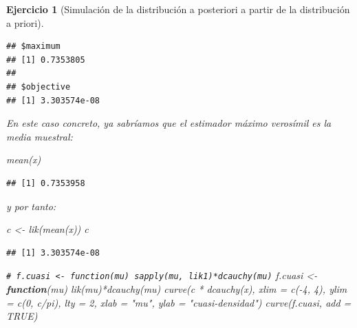 \documentclass[
]{book}
\newenvironment{Shaded}{\begin{snugshade}}{\end{snugshade}}
\newcommand{\AttributeTok}[1]{\textcolor[rgb]{0.77,0.63,0.00}{#1}}
\newcommand{\CommentTok}[1]{\textcolor[rgb]{0.56,0.35,0.01}{\textit{#1}}}
\newcommand{\ConstantTok}[1]{\textcolor[rgb]{0.00,0.00,0.00}{#1}}
\newcommand{\ControlFlowTok}[1]{\textcolor[rgb]{0.13,0.29,0.53}{\textbf{#1}}}
\newcommand{\DecValTok}[1]{\textcolor[rgb]{0.00,0.00,0.81}{#1}}
\newcommand{\FunctionTok}[1]{\textcolor[rgb]{0.00,0.00,0.00}{#1}}
\newcommand{\NormalTok}[1]{#1}
\newcommand{\OtherTok}[1]{\textcolor[rgb]{0.56,0.35,0.01}{#1}}
\newcommand{\SpecialCharTok}[1]{\textcolor[rgb]{0.00,0.00,0.00}{#1}}
\newcommand{\StringTok}[1]{\textcolor[rgb]{0.31,0.60,0.02}{#1}}
\theoremstyle{break}
\newtheorem{exercise}{Ejercicio}[chapter]
\theoremstyle{nonumberplain}
\renewcommand{\CommentTok}[1]{\textcolor[rgb]{0.41,0.41,0.41}{\texttt{#1}}}
\begin{document}
\begin{exercise}[Simulación de la distribución a posteriori a partir de la distribución a priori]
\begin{enumerate}
\begin{verbatim}
## $maximum
## [1] 0.7353805
## 
## $objective
## [1] 3.303574e-08
\end{verbatim}

\begin{Shaded}
\end{Shaded}

  En este caso concreto, ya sabríamos que el estimador máximo verosímil es la media muestral:

\begin{Shaded}
\begin{Highlighting}[]
\FunctionTok{mean}\NormalTok{(x)}
\end{Highlighting}
\end{Shaded}

\begin{verbatim}
## [1] 0.7353958
\end{verbatim}

  y por tanto:

\begin{Shaded}
\begin{Highlighting}[]
\NormalTok{c }\OtherTok{\textless{}{-}} \FunctionTok{lik}\NormalTok{(}\FunctionTok{mean}\NormalTok{(x))}
\NormalTok{c   }
\end{Highlighting}
\end{Shaded}

\begin{verbatim}
## [1] 3.303574e-08
\end{verbatim}

\begin{Shaded}
\begin{Highlighting}[]
\CommentTok{\# f.cuasi \textless{}{-} function(mu) sapply(mu, lik1)*dcauchy(mu)}
\NormalTok{f.cuasi }\OtherTok{\textless{}{-}} \ControlFlowTok{function}\NormalTok{(mu) }\FunctionTok{lik}\NormalTok{(mu)}\SpecialCharTok{*}\FunctionTok{dcauchy}\NormalTok{(mu)    }
\FunctionTok{curve}\NormalTok{(c }\SpecialCharTok{*} \FunctionTok{dcauchy}\NormalTok{(x), }\AttributeTok{xlim =} \FunctionTok{c}\NormalTok{(}\SpecialCharTok{{-}}\DecValTok{4}\NormalTok{, }\DecValTok{4}\NormalTok{), }\AttributeTok{ylim =} \FunctionTok{c}\NormalTok{(}\DecValTok{0}\NormalTok{, c}\SpecialCharTok{/}\NormalTok{pi), }\AttributeTok{lty =} \DecValTok{2}\NormalTok{,}
      \AttributeTok{xlab =} \StringTok{"mu"}\NormalTok{, }\AttributeTok{ylab =} \StringTok{"cuasi{-}densidad"}\NormalTok{)}
\FunctionTok{curve}\NormalTok{(f.cuasi, }\AttributeTok{add =} \ConstantTok{TRUE}\NormalTok{)}
\end{Highlighting}
\end{Shaded}


\end{enumerate}
\end{exercise}
\end{document}
